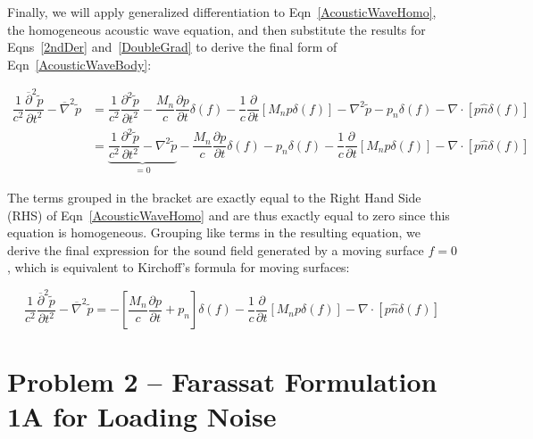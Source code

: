 \documentclass[]{aiaa-tc}%
\begin{document}
Finally, we will apply generalized differentiation to Eqn~\ref{AcousticWaveHomo}, the homogeneous acoustic wave equation, and then substitute the results for Eqns~\ref{2ndDer} and~\ref{DoubleGrad} to derive the final form of Eqn~\ref{AcousticWaveBody}:

\begin{align*}
\dfrac{1}{c^2}\dfrac{\overline{\partial}^2 \widetilde{p}}{\partial t^2}
    - \overline{\nabla}^2 \widetilde{p}
&= \dfrac{1}{c^2} \dfrac{\partial^2\widetilde{p}}{\partial t^2}
    - \dfrac{M_n}{c} \dfrac{\partial p}{\partial t}  \delta(f)
    - \dfrac{1}{c}\dfrac{\partial}{\partial t} \left[ M_n p\delta(f) \right]
    -\nabla^2\widetilde{p} - p_n \delta(f)
    - \nabla\cdot \left[ p\hat{n} \delta(f) \right] \\
&= \underbrace{\dfrac{1}{c^2} \dfrac{\partial^2\widetilde{p}}{\partial t^2}
    -\nabla^2\widetilde{p}}_{=0}
    - \dfrac{M_n}{c} \dfrac{\partial p}{\partial t}  \delta(f)
    - p_n \delta(f)
    - \dfrac{1}{c}\dfrac{\partial}{\partial t} \left[ M_n p\delta(f) \right]
    - \nabla\cdot \left[ p\hat{n} \delta(f) \right]
\end{align*}

The terms grouped in the bracket are exactly equal to the Right Hand Side (RHS) of Eqn~\ref{AcousticWaveHomo} and are thus exactly equal to zero since this equation is homogeneous.  Grouping like terms in the resulting equation, we derive the final expression for the sound field generated by a moving surface $f=0$, which is equivalent to Kirchoff's formula for moving surfaces:

\begin{equation}
\boxed{\dfrac{1}{c^2}\dfrac{\overline{\partial}^2 \widetilde{p}}{\partial t^2}
    - \overline{\nabla}^2 \widetilde{p}
= -\left[\dfrac{M_n}{c} \dfrac{\partial p}{\partial t} + p_n  \right] \delta(f)
    - \dfrac{1}{c}\dfrac{\partial}{\partial t} \left[ M_n p\delta(f) \right]
    - \nabla\cdot \left[ p\hat{n} \delta(f) \right]}
\end{equation}





\section{Problem 2 -- Farassat Formulation 1A for Loading Noise} \label{SecFarassat}
\end{document}
